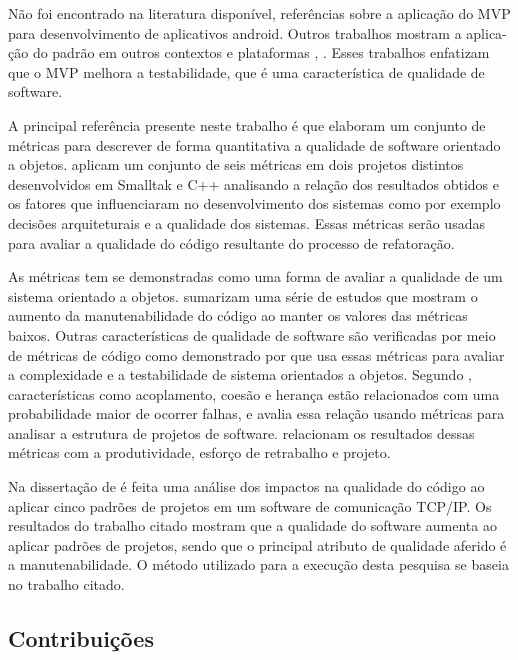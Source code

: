\documentclass[conference]{IEEEtran}
\begin{document}
Não foi encontrado na literatura disponível, referências sobre a aplicação do
MVP para desenvolvimento de aplicativos android. Outros trabalhos mostram a
aplica- ção do padrão em outros contextos e plataformas  \cite{presenterfirst},
\cite{yangmvp}. Esses trabalhos enfatizam que o MVP melhora a
testabilidade, que é uma característica de qualidade de software.

A principal referência presente neste trabalho é  que
elaboram um conjunto de métricas para descrever de forma quantitativa a
qualidade de software orientado a objetos.  aplicam um
conjunto de seis métricas em dois projetos distintos desenvolvidos em Smalltak e
C++ analisando a relação dos resultados obtidos e os fatores que influenciaram
no desenvolvimento dos sistemas como por exemplo decisões arquiteturais e a
qualidade dos sistemas. Essas métricas serão usadas para avaliar a qualidade do
código resultante do processo de refatoração.

As métricas  tem se demonstradas como uma forma de avaliar a
qualidade de um sistema orientado a objetos.  sumarizam
uma série de estudos que mostram o aumento da manutenabilidade do código ao
manter os valores das métricas baixos. Outras características de
qualidade de software são verificadas por meio de métricas de código
como demonstrado por  que usa essas métricas para
avaliar a complexidade e a testabilidade de sistema orientados a objetos.
Segundo , características como acoplamento, coesão e
herança estão relacionados com uma probabilidade maior de ocorrer falhas, e
avalia essa relação usando métricas para analisar a estrutura de projetos de
software.  relacionam os resultados dessas métricas com a
produtividade, esforço de retrabalho e projeto.

Na dissertação de  é feita uma análise dos impactos na
qualidade do código  ao aplicar cinco padrões de projetos em um software de comunicação
TCP/IP. Os resultados do trabalho citado mostram que a qualidade do software
aumenta ao aplicar padrões de projetos, sendo que o principal atributo de
qualidade aferido é a manutenabilidade. O método utilizado para a execução desta
pesquisa se baseia no trabalho citado. 

\subsection{Contribuições}
\end{document}
